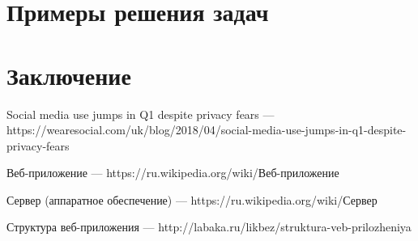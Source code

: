 \documentclass[14pt,a4paper]{scrartcl}
\begin{document}
    \newpage
    \section[Примеры решения задач]{Примеры решения задач}

    \newpage
    \section[Заключение]{Заключение}

    \newpage
    \begin{thebibliography}{9}
        Social media use jumps in Q1 despite privacy fears
        \newblock --- https://wearesocial.com/uk/blog/2018/04/social-media-use-jumps-in-q1-despite-privacy-fears

        Веб-приложение
        \newblock --- https://ru.wikipedia.org/wiki/Веб-приложение

        Сервер (аппаратное обеспечение)
        \newblock --- https://ru.wikipedia.org/wiki/Сервер

        Структура веб-приложения
        \newblock --- http://labaka.ru/likbez/struktura-veb-prilozheniya



    \end{thebibliography}
\end{document}
